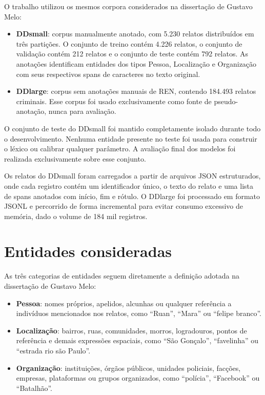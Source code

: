 \documentclass[12pt,a4paper]{article}
\begin{document}
O trabalho utilizou os mesmos corpora considerados na dissertação de Gustavo Melo:

\begin{itemize}
  \item \textbf{DDsmall}: corpus manualmente anotado, com 5.230 relatos distribuídos
    em três partições. O conjunto de treino contém 4.226 relatos, o conjunto de
    validação contém 212 relatos e o conjunto de teste contém 792 relatos. As
    anotações identificam entidades dos tipos Pessoa, Localização e Organização
    com seus respectivos spans de caracteres no texto original.
  \item \textbf{DDlarge}: corpus sem anotações manuais de REN, contendo 184.493
    relatos criminais. Esse corpus foi usado exclusivamente como fonte de
    pseudo-anotação, nunca para avaliação.
\end{itemize}

O conjunto de teste do DDsmall foi mantido completamente isolado durante todo o
desenvolvimento. Nenhuma entidade presente no teste foi usada para construir o
léxico ou calibrar qualquer parâmetro. A avaliação final dos modelos foi realizada
exclusivamente sobre esse conjunto.

Os relatos do DDsmall foram carregados a partir de arquivos JSON estruturados,
onde cada registro contém um identificador único, o texto do relato e uma lista
de spans anotados com início, fim e rótulo. O DDlarge foi processado em formato
JSONL e percorrido de forma incremental para evitar consumo excessivo de memória,
dado o volume de 184 mil registros.

\section{Entidades consideradas}

As três categorias de entidades seguem diretamente a definição adotada na
dissertação de Gustavo Melo:

\begin{itemize}
  \item \textbf{Pessoa}: nomes próprios, apelidos, alcunhas ou qualquer referência
    a indivíduos mencionados nos relatos, como ``Ruan'', ``Mara'' ou ``felipe branco''.
  \item \textbf{Localização}: bairros, ruas, comunidades, morros, logradouros,
    pontos de referência e demais expressões espaciais, como ``São Gonçalo'',
    ``favelinha'' ou ``estrada rio são Paulo''.
  \item \textbf{Organização}: instituições, órgãos públicos, unidades policiais,
    facções, empresas, plataformas ou grupos organizados, como ``polícia'',
    ``Facebook'' ou ``Batalhão''.
\end{itemize}
\end{document}
